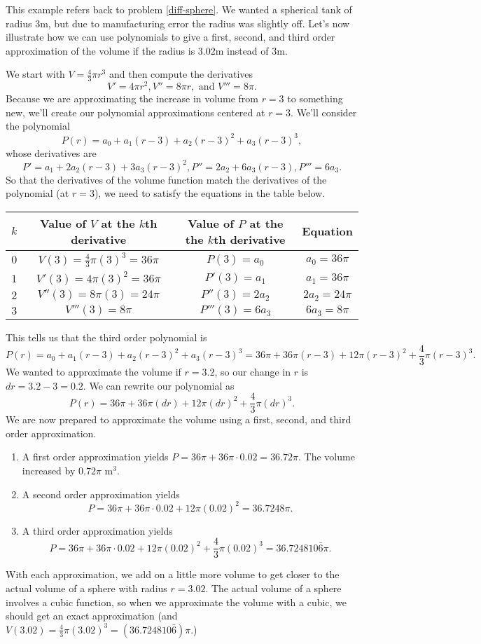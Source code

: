 \begin{example}
This example refers back to problem \ref{diff-sphere}. We wanted a spherical tank of radius 3m, but due to manufacturing error the radius was slightly off. Let's now illustrate how we can use polynomials to give a first, second, and third order approximation of the volume if the radius is 3.02m instead of 3m.  

We start with $V=\frac{4}{3} \pi r^3$ and then compute the derivatives $$V'=4\pi r^2, V''=8\pi r, \text{ and } V'''=8\pi.$$ Because we are approximating the increase in volume from $r=3$ to something new, we'll create our polynomial approximations centered at $r=3$. We'll consider the polynomial 
$$P(r)=a_0+a_1(r-3)+a_2(r-3)^2+a_3(r-3)^3,$$ 
whose derivatives are 
$$P'=a_1+2a_2(r-3)+3a_3(r-3)^2,
P''=2a_2+6a_3(r-3),
P'''=6a_3.$$
So that the derivatives of the volume function match the derivatives of the polynomial (at $r=3$), we need to satisfy the equations in the table below.
\begin{center}
\begin{tabular}{|c|c|c|c|}\hline
 $k$ & Value of $V$ at the $k$th derivative & Value of $P$ at the the $k$th derivative & Equation \\ \hline
 $0$ & $V(3) = \frac{4}{3}\pi (3)^3 = 36\pi$ & $P(3) = a_0$ & $a_0=36\pi$ \\ \hline
 $1$ & $V'(3) = 4\pi (3)^2=36\pi$ & $P'(3) = a_1$ & $a_1=36\pi$ \\ \hline
 $2$ & $V''(3) = 8\pi (3)=24\pi$ & $P''(3) = 2a_2$ & $2a_2=24\pi$ \\ \hline
 $3$ & $V'''(3) = 8\pi$ & $P'''(3) = 6a_3$ & $6a_3=8\pi$ \\ \hline
\end{tabular}
\end{center}
This tells us that the third order polynomial is 
$$P(r)=a_0+a_1(r-3)+a_2(r-3)^2+a_3(r-3)^3
=36\pi+36\pi(r-3)+12\pi(r-3)^2+\frac{4}{3}\pi(r-3)^3
.$$ 
We wanted to approximate the volume if $r=3.2$, so our change in $r$ is $dr=3.2-3=0.2$.  We can rewrite our polynomial as
$$P(r)=36\pi+36\pi(dr)+12\pi(dr)^2+\frac{4}{3}\pi(dr)^3.$$
We are now prepared to approximate the volume using a first, second, and third order approximation. 
 \begin{enumerate}
 \item A first order approximation yields $P=36\pi+ 36\pi\cdot 0.02 =36.72\pi.$ The volume increased by $0.72\pi$ m$^3$. 
 \item A second order approximation yields $$P=36\pi+ 36\pi\cdot 0.02 +12\pi (0.02)^2 =36.7248\pi.$$
 \item A third order approximation yields $$P=36\pi+36\pi\cdot 0.02 +12\pi (0.02)^2+\frac{4}{3}\pi(0.02)^3  =36.724810\bar6\pi.$$
 \end{enumerate}
With each approximation, we add on a little more volume to get closer to the actual volume of a sphere with radius $r=3.02$. The actual volume of a sphere involves a cubic function, so when we approximate the volume with a cubic, we should get an exact approximation (and $ V(3.02) = \frac 43 \pi (3.02)^3 =(36.724810\bar6)\pi$.)
 \end{example}
 
